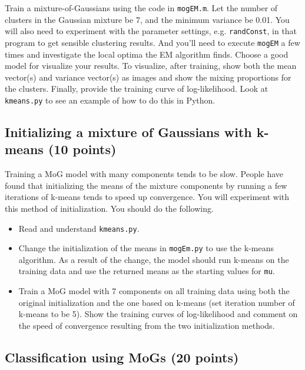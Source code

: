 \documentclass[12pt]{article}
\begin{document}
\label{sec:training}

Train a mixture-of-Gaussians using the code in {\tt mogEM.m}. Let the number of clusters in the Gaussian mixture be 7, and the minimum variance be 0.01. You will also need to experiment with the parameter settings, e.g. {\tt randConst}, in that program to get sensible clustering results. And you'll need to execute {\tt mogEM} a few times and investigate the local optima the EM algorithm finds. Choose a good model for visualize your results. To visualize, after training, show both the mean vector(s) and variance vector(s) as images and show the mixing proportions for the clusters. Finally, provide the training curve of log-likelihood. Look at {\tt kmeans.py} to see an example of how to do this in Python.

\subsection{Initializing a mixture of Gaussians with k-means (10 points)}

Training a MoG model with many components tends to be slow.  People have found
that initializing the means of the mixture components by running a few
iterations of k-means tends to speed up convergence. You will experiment with
this method of initialization. You should do the following.


\begin{itemize}

\item Read and understand {\tt kmeans.py}.

\item Change the initialization of the means in {\tt mogEm.py} to use the k-means algorithm. As a result of the change, the model should run k-means on the training data and use the returned means as the starting values for {\tt mu}. 

\item Train a MoG model with 7 components on all training data using both the original initialization and the one based on k-means (set iteration number of k-means to be 5). Show the training curves of log-likelihood and comment on the speed of convergence resulting from the two initialization methods.

\end{itemize}

\subsection{Classification using MoGs (20 points)}
\end{document}

